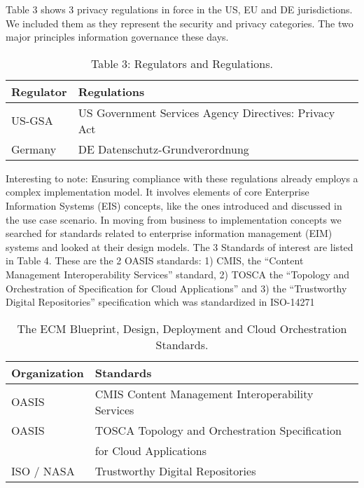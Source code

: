 %
Table 3 shows 3 privacy regulations in force in the US, EU and DE jurisdictions. We included them as they represent the security and privacy categories. The two major principles information governance these days. 
%
\begin{table}[h]
\caption{Table 3: Regulators and Regulations.}
\label{tab:example1} \centering
 \scalebox{0.55} {\begin{tabular}{|l|l|}
 \hline
  {Regulator} & {Regulations}\\
  \hline
  {US-GSA} & {US Government Services Agency Directives: Privacy Act \cite{USGSA}}\\
  \hline
  {Germany} & {DE Datenschutz-Grundverordnung} \\
  \hline 
 \end{tabular}}
\end{table}
%
Interesting to note: Ensuring compliance with these regulations already employs a complex implementation model. It involves elements of core Enterprise Information Systems (EIS) concepts, like the ones introduced and discussed in the use case scenario. 
In moving from business to implementation concepts we searched for standards related to enterprise information management (EIM) systems and looked at their design models. The 3 Standards of interest are listed in Table 4. These are the 2 OASIS standards: 1) CMIS, the “Content Management Interoperability Services” standard, 2) TOSCA the “Topology and Orchestration of Specification for Cloud Applications” and 3) the “Trustworthy Digital Repositories” specification which was standardized in ISO-14271
\begin{table}[h]
\caption{The ECM Blueprint, Design, Deployment and Cloud Orchestration Standards.}
\label{tab:example1} \centering
 \scalebox{0.55} {\begin{tabular}{|l|l|}
 \hline
  {Organization} & {Standards}\\
  \hline
  {OASIS} & {CMIS Content Management Interoperability Services \cite{CMIS}}\\
  \hline
  {OASIS} & {TOSCA Topology and Orchestration Specification } \\
  {} & { for Cloud Applications \cite{TOSCA}} \\  
  \hline 
  {ISO / NASA} & { Trustworthy Digital Repositories \cite{ISO14721}}\\
  \hline
 \end{tabular}}
\end{table}
